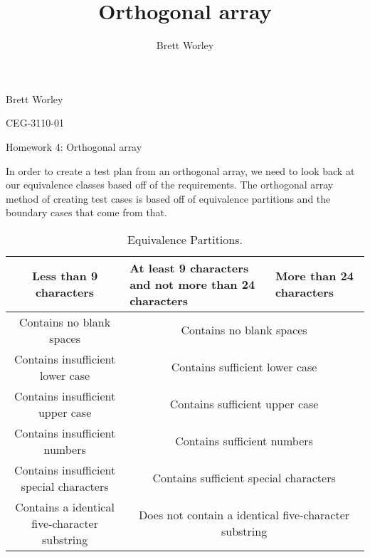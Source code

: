 \documentclass[12pt,letterpaper]{article}
\author{Brett Worley}
\title{Orthogonal array}
\begin{document}
Brett Worley

CEG-3110-01

\centerline{ Homework 4: Orthogonal array}

In order to create a test plan from an orthogonal array, we need to look back at our equivalence classes
based off of the requirements.  The orthogonal array method of creating test cases is based off of equivalence partitions
and the boundary cases that come from that.


\begin{table}[h!]
  \begin{center}
    \caption{Equivalence Partitions.}
    \label{tab:table1}
    
    \begin{tabular}{||c|m{4cm}|m{5cm}||}
    \hline
    Less than 9 characters & At least 9 characters and not more than 24
    characters & More than 24 characters \\
    
    \hline \hline
    \multicolumn{1}{||c|}{Contains no blank spaces} & \multicolumn{2}{c||}{Contains no blank spaces} \\
    
    \hline \hline
    \multicolumn{1}{||c|}{Contains insufficient lower case} 
    & \multicolumn{2}{c||}{Contains sufficient lower case} \\
    
    \hline \hline
    \multicolumn{1}{||c|}{Contains insufficient upper case} 
    & \multicolumn{2}{c||}{Contains sufficient upper case} \\
    
    \hline \hline
    \multicolumn{1}{||c|}{Contains insufficient numbers} 
    & \multicolumn{2}{c||}{Contains sufficient numbers} \\
    
    \hline \hline
    \multicolumn{1}{||c|}{Contains insufficient special characters} 
    & \multicolumn{2}{c||}{Contains sufficient special characters} \\
    
    \hline \hline
    \multicolumn{1}{||c|}{Contains a identical five-character substring}
    & \multicolumn{2}{c||}{Does not contain a identical five-character substring} \\
    \hline
    \end{tabular}
  \end{center}
\end{table}
\end{document}
